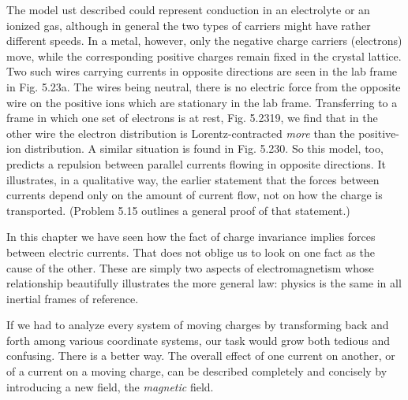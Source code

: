 The model ust described could represent conduction in an electrolyte
or an ionized gas, although in general the two types of carriers
might have rather different speeds. In a metal, however, only the
negative charge carriers (electrons) move, while the corresponding
positive charges remain fixed in the crystal lattice. Two such wires
carrying currents in opposite directions are seen in the lab frame in
Fig. 5.23a. The wires being neutral, there is no electric force from
the opposite wire on the positive ions which are stationary in the lab
frame. Transferring to a frame in which one set of electrons is at
rest, Fig. 5.2319, we find that in the other wire the electron distribution
is Lorentz-contracted \emph{more} than the positive-ion distribution. A
similar situation is found in Fig. 5.230. So this model, too, predicts
a repulsion between parallel currents flowing in opposite directions.
It illustrates, in a qualitative way, the earlier statement that the forces
between currents depend only on the amount of current flow, not on
how the charge is transported. (Problem 5.15 outlines a general
proof of that statement.)

In this chapter we have seen how the fact of charge invariance implies
forces between electric currents. That does not oblige us to
look on one fact as the cause of the other. These are simply two
aspects of electromagnetism whose relationship beautifully illustrates
the more general law: physics is the same in all inertial frames
of reference.

If we had to analyze every system of moving charges by transforming
back and forth among various coordinate systems, our task would
grow both tedious and confusing. There is a better way. The overall
effect of one current on another, or of a current on a moving charge,
can be described completely and concisely by introducing a new field,
the \emph{magnetic} field.
